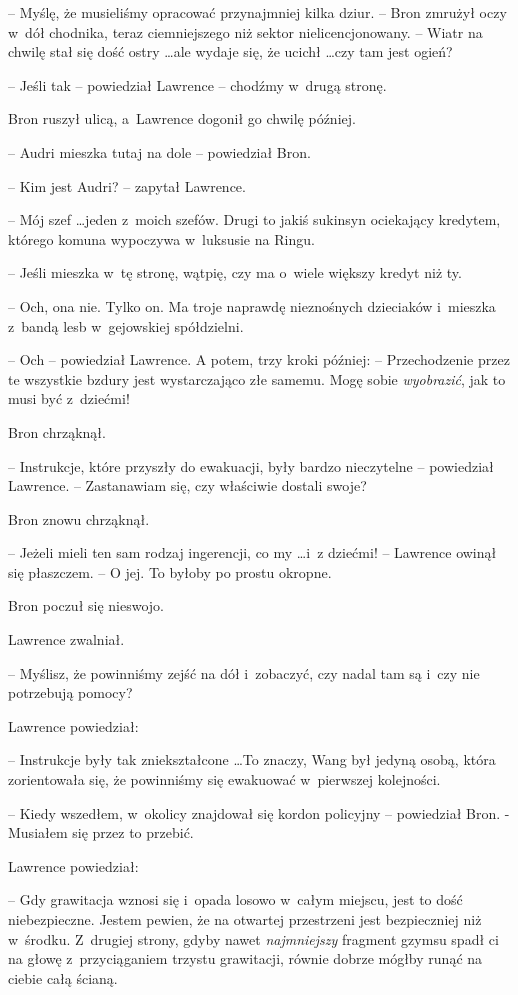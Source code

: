 \documentclass[oneside,polish,11pt,rmheadings]{mwbk}
\begin{document}
-- Myślę, że musieliśmy opracować przynajmniej kilka dziur. --  Bron zmrużył oczy w~dół chodnika, teraz ciemniejszego niż sektor nielicencjonowany. -- Wiatr na chwilę stał się dość ostry \ldots  ale wydaje się, że ucichł \ldots  czy tam jest ogień? 

-- Jeśli tak -- powiedział Lawrence -- chodźmy w~drugą stronę. 

Bron ruszył ulicą, a~Lawrence dogonił go chwilę później. 

-- Audri mieszka tutaj na dole -- powiedział Bron. 

-- Kim jest Audri? -- zapytał Lawrence. 

-- Mój szef  \ldots  jeden z~moich szefów. Drugi to jakiś sukinsyn ociekający kredytem, którego komuna wypoczywa w~luksusie na Ringu. 

-- Jeśli mieszka w~tę stronę, wątpię, czy ma o~wiele większy kredyt niż ty. 

-- Och, ona nie. Tylko on. Ma troje naprawdę nieznośnych dzieciaków i~mieszka z~bandą lesb w~gejowskiej spółdzielni. 

-- Och -- powiedział Lawrence. A potem, trzy kroki później: -- Przechodzenie przez te wszystkie bzdury jest wystarczająco złe samemu. Mogę sobie \textit{wyobrazić}, jak to musi być z~dziećmi!  

Bron chrząknął. 

-- Instrukcje, które przyszły do ewakuacji, były bardzo nieczytelne --  powiedział Lawrence. -- Zastanawiam się, czy właściwie dostali swoje? 

Bron znowu chrząknął. 

-- Jeżeli mieli ten sam rodzaj ingerencji, co my \ldots  i~z dziećmi! -- Lawrence owinął się płaszczem. -- O jej. To byłoby po prostu okropne. 

Bron poczuł się nieswojo. 

Lawrence zwalniał. 

-- Myślisz, że powinniśmy zejść na dół i~zobaczyć, czy nadal tam są i~czy nie potrzebują pomocy? 

Lawrence powiedział: 

-- Instrukcje były tak zniekształcone \ldots   To znaczy, Wang był jedyną osobą, która zorientowała się, że powinniśmy się ewakuować w~pierwszej kolejności. 

-- Kiedy wszedłem, w~okolicy znajdował się kordon policyjny -- powiedział Bron. -Musiałem się przez to przebić. 

Lawrence powiedział: 

-- Gdy grawitacja wznosi się i~opada losowo w~całym miejscu, jest to dość niebezpieczne. Jestem pewien, że na otwartej przestrzeni jest bezpieczniej niż w~środku. Z~drugiej strony, gdyby nawet \textit{najmniejszy }fragment gzymsu spadł ci na głowę z~przyciąganiem trzystu grawitacji, równie dobrze mógłby runąć na ciebie całą ścianą. 
\end{document}
